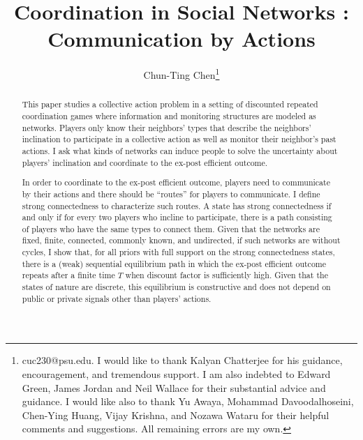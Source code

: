 \documentclass[12pt,letterpaper]{article}
\newtheorem*{main result}{Main Result}
\theoremstyle{definition}
\theoremstyle{remark}
\theoremstyle{claim}
\begin{document}



\title {Coordination in Social Networks : Communication by Actions}


\author {Chun-Ting Chen\thanks{cuc230@psu.edu. I would like to thank Kalyan Chatterjee for his guidance, encouragement, and tremendous support. I am also indebted to Edward Green, James Jordan and Neil Wallace for their substantial advice and guidance. I would like also to thank Yu Awaya, Mohammad Davoodalhoseini, Chen-Ying Huang, Vijay Krishna, and Nozawa Wataru for their helpful comments and suggestions. All remaining errors are my own.}}




\maketitle








\begin{abstract}

This paper studies a collective action problem in a setting of discounted repeated coordination games where information and monitoring structures are modeled as networks. Players only know their neighbors' types that describe the neighbors' inclination to participate in a collective action as well as monitor their neighbor's past actions. I ask what kinds of networks can induce people to solve the uncertainty about players' inclination and coordinate to the ex-post efficient outcome.

In order to coordinate to the ex-post efficient outcome, players need to communicate by their actions and there should be ``routes'' for players to communicate. I define strong connectedness to characterize such routes. A state has strong connectedness if and only if for every two players who incline to participate, there is a path consisting of players who have the same types to connect them. Given that the networks are fixed, finite, connected, commonly known, and undirected, if such networks are without cycles, I show that, for all priors with full support on the strong connectedness states, there is a (weak) sequential equilibrium path in which the ex-post efficient outcome repeats after a finite time $T$ when discount factor is sufficiently high. Given that the states of nature are discrete, this equilibrium is constructive and does not depend on public or private signals other than players' actions.



\end{abstract}
\end{document}
